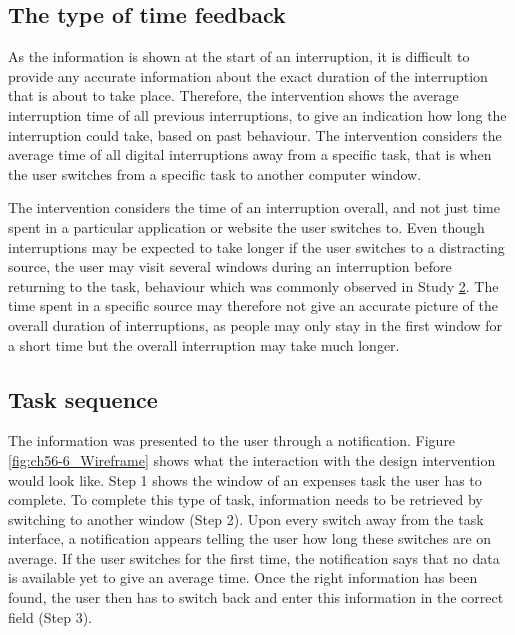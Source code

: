 \subsection{The type of time feedback}
As the information is shown at the start of an interruption, it is difficult to provide any accurate information about the exact duration of the interruption that is about to take place. Therefore, the intervention shows the average interruption time of all previous interruptions, to give an indication how long the interruption could take, based on past behaviour. The intervention considers the average time of all digital interruptions away from a specific task, that is when the user switches from a specific task to another computer window. 

The intervention considers the time of an interruption overall, and not just time spent in a particular application or website the user switches to. Even though interruptions may be expected to take longer if the user switches to a distracting source, the user may visit several windows during an interruption before returning to the task, behaviour which was commonly observed in Study \hyperref[st:Study2]{2}. The time spent in a specific source may therefore not give an accurate picture of the overall duration of interruptions, as people may only stay in the first window for a short time but the overall interruption may take much longer. 

\subsection{Task sequence}
The information was presented to the user through a notification. Figure \ref{fig:ch56-6_Wireframe} shows what the interaction with the design intervention would look like. Step 1 shows the window of an expenses task the user has to complete. To complete this type of task, information needs to be retrieved by switching to another window (Step 2). Upon every switch away from the task interface, a notification appears telling the user how long these switches are on average. If the user switches for the first time, the notification says that no data is available yet to give an average time. Once the right information has been found, the user then has to switch back and enter this information in the correct field (Step 3). 

